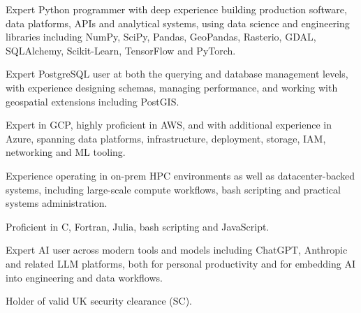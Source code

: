 \begin{cventries}
  \cventry
    {}
    {}
    {}
    {}
    {
      \begin{cvitems}
        \item {Expert Python programmer with deep experience building production software, data platforms, APIs and analytical systems, using data science and engineering libraries including NumPy, SciPy, Pandas, GeoPandas, Rasterio, GDAL, SQLAlchemy, Scikit-Learn, TensorFlow and PyTorch.}
        \item {Expert PostgreSQL user at both the querying and database management levels, with experience designing schemas, managing performance, and working with geospatial extensions including PostGIS.}
        \item {Expert in GCP, highly proficient in AWS, and with additional experience in Azure, spanning data platforms, infrastructure, deployment, storage, IAM, networking and ML tooling.}
        \item {Experience operating in on-prem HPC environments as well as datacenter-backed systems, including large-scale compute workflows, bash scripting and practical systems administration.}
        \item {Proficient in C, Fortran, Julia, bash scripting and JavaScript.}
        \item {Expert AI user across modern tools and models including ChatGPT, Anthropic and related LLM platforms, both for personal productivity and for embedding AI into engineering and data workflows.}
        \item {Holder of valid UK security clearance (SC).}
      \end{cvitems}
    }
\end{cventries}
